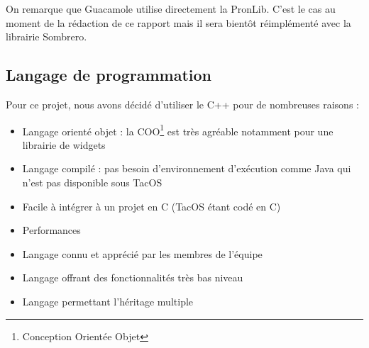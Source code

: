 On remarque que Guacamole utilise directement la PronLib.
C'est le cas au moment de la rédaction de ce rapport mais il sera bientôt réimplémenté avec la librairie Sombrero.

\subsection{Langage de programmation}

Pour ce projet, nous avons décidé d'utiliser le C++ pour de nombreuses raisons :

\begin{itemize}
  \item Langage orienté objet : la COO\footnote{Conception Orientée Objet} est très agréable notamment pour une librairie de widgets
  \item Langage compilé : pas besoin d'environnement d'exécution comme Java qui n'est pas disponible sous TacOS
  \item Facile à intégrer à un projet en C (TacOS étant codé en C)
  \item Performances
  \item Langage connu et apprécié par les membres de l'équipe
  \item Langage offrant des fonctionnalités très bas niveau
  \item Langage permettant l'héritage multiple
\end{itemize}